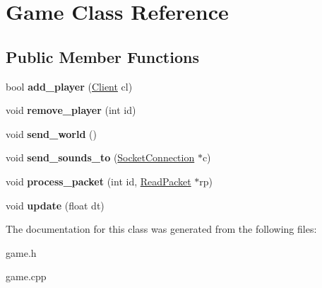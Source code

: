 \hypertarget{class_game}{\section{Game Class Reference}
\label{class_game}
}
\subsection*{Public Member Functions}
\begin{DoxyCompactItemize}
\item 
\hypertarget{class_game_a5a53fbc1ec712cd70ecc54f1d07c390b}{bool {\bfseries add\-\_\-player} (\hyperlink{class_client}{Client} cl)}\label{class_game_a5a53fbc1ec712cd70ecc54f1d07c390b}

\item 
\hypertarget{class_game_aebddf723758c118c2693f58d9dca3b52}{void {\bfseries remove\-\_\-player} (int id)}\label{class_game_aebddf723758c118c2693f58d9dca3b52}

\item 
\hypertarget{class_game_a5758f33d3f7da202aef70865025714c2}{void {\bfseries send\-\_\-world} ()}\label{class_game_a5758f33d3f7da202aef70865025714c2}

\item 
\hypertarget{class_game_a9ec2affa9074115ddf6053d7338cfbb5}{void {\bfseries send\-\_\-sounds\-\_\-to} (\hyperlink{class_socket_connection}{Socket\-Connection} $\ast$c)}\label{class_game_a9ec2affa9074115ddf6053d7338cfbb5}

\item 
\hypertarget{class_game_a1b351b4b7f892c69709a99c96ab6a88d}{void {\bfseries process\-\_\-packet} (int id, \hyperlink{class_read_packet}{Read\-Packet} $\ast$rp)}\label{class_game_a1b351b4b7f892c69709a99c96ab6a88d}

\item 
\hypertarget{class_game_a2648dc91da0dd1424d5b7c45510515a0}{void {\bfseries update} (float dt)}\label{class_game_a2648dc91da0dd1424d5b7c45510515a0}

\end{DoxyCompactItemize}


The documentation for this class was generated from the following files\-:\begin{DoxyCompactItemize}
\item 
game.\-h\item 
game.\-cpp\end{DoxyCompactItemize}
